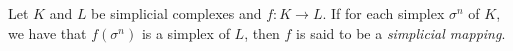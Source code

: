 \documentclass[12pt]{article}
\begin{document}
Let $K$ and $L$ be simplicial complexes and $f: K \to L$.
If for each simplex $\sigma^n$ of $K$, we have that $f(\sigma^n)$ is a simplex
of $L$, then $f$ is said to be a \emph{simplicial mapping}.


\end{document}
